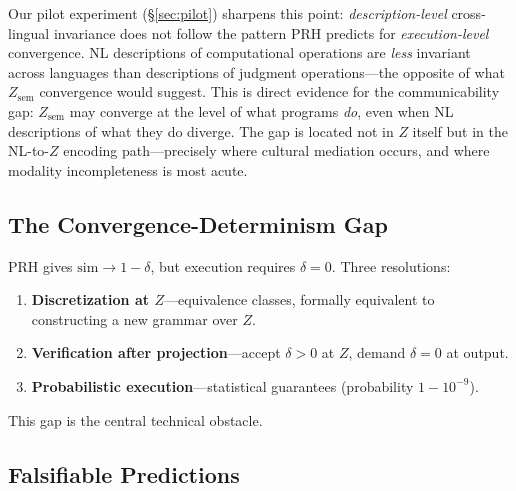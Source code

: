 \documentclass[11pt]{article}
\theoremstyle{definition}
\newcommand{\Zsem}{Z_{\text{sem}}}
\begin{document}
Our pilot experiment (\S\ref{sec:pilot}) sharpens this point: \emph{description-level} cross-lingual invariance does not follow the pattern PRH predicts for \emph{execution-level} convergence. NL descriptions of computational operations are \emph{less} invariant across languages than descriptions of judgment operations---the opposite of what $\Zsem$ convergence would suggest. This is direct evidence for the communicability gap: $\Zsem$ may converge at the level of what programs \emph{do}, even when NL descriptions of what they do diverge. The gap is located not in $Z$ itself but in the NL-to-$Z$ encoding path---precisely where cultural mediation occurs, and where modality incompleteness is most acute.

\subsection{The Convergence-Determinism Gap}

PRH gives $\mathrm{sim} \to 1 - \delta$, but execution requires $\delta = 0$. Three resolutions:
\begin{enumerate}[nosep]
  \item \textbf{Discretization at $Z$}---equivalence classes, formally equivalent to constructing a new grammar over $Z$.
  \item \textbf{Verification after projection}---accept $\delta > 0$ at $Z$, demand $\delta = 0$ at output.
  \item \textbf{Probabilistic execution}---statistical guarantees (probability $1 - 10^{-9}$).
\end{enumerate}
This gap is the central technical obstacle.

\subsection{Falsifiable Predictions}\label{sec:predictions}
\end{document}
